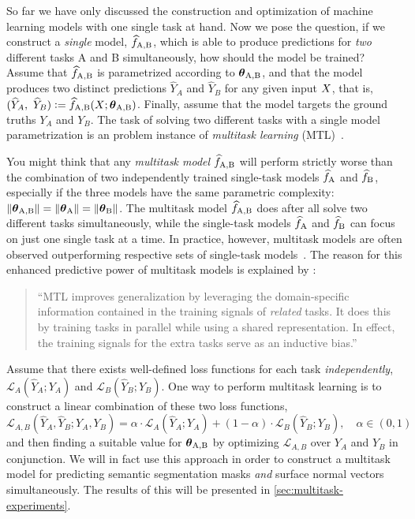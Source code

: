 So far we have only discussed the construction and optimization of machine learning models with one single task at hand.
Now we pose the question, if we construct a \emph{single} model, $\widehat{f}_{\mathrm{A,B}}$, which is able to produce predictions for \emph{two} different tasks A and B simultaneously, how should the model be trained?
Assume that $\widehat{f}_{\mathrm{A,B}}$ is parametrized according to $\boldsymbol{\theta}_{\mathrm{A,B}}$, and that the model produces two distinct predictions $\widehat{Y}_A$ and $\widehat{Y}_B$ for any given input $X$, that is, $(\widehat{Y}_A,~\widehat{Y}_B) \vcentcolon= \widehat{f}_{\mathrm{A,B}}(X; \boldsymbol{\theta}_{\mathrm{A,B}})$.
Finally, assume that the model targets the ground truths $Y_A$ and $Y_B$.
The task of solving two different tasks with a single model parametrization is an problem instance of \textit{multitask learning} (MTL)~\cite{multitask-learning}.

You might think that any \textit{multitask model} $\widehat{f}_{\mathrm{A,B}}$ will perform strictly worse than the combination of two independently trained single-task models $\widehat{f}_{\mathrm{A}}$ and $\widehat{f}_{\mathrm{B}}$, especially if the three models have the same parametric complexity: $\left\lVert\boldsymbol{\theta}_{\mathrm{A,B}}\right\rVert = \left\lVert\boldsymbol{\theta}_{\mathrm{A}}\right\rVert = \left\lVert\boldsymbol{\theta}_{\mathrm{B}}\right\rVert$.
The multitask model $\widehat{f}_{\mathrm{A,B}}$ does after all solve two different tasks simultaneously, while the single-task models $\widehat{f}_{\mathrm{A}}$ and $\widehat{f}_{\mathrm{B}}$ can focus on just one single task at a time.
In practice, however, multitask models are often observed outperforming respective sets of single-task models~\cite[Section 2]{multitask-learning}.
The reason for this enhanced predictive power of multitask models is explained by \citeauthor{multitask-learning}:
\begin{quotation}
  \enquote{MTL improves generalization by leveraging the domain-specific information contained in the training signals of \textit{related} tasks. It does this by training tasks in parallel while using a shared representation. In effect, the training signals for the extra tasks serve as an inductive bias.}~\cite[p.~41]{multitask-learning}
\end{quotation}

Assume that there exists well-defined loss functions for each task \emph{independently}, $\mathcal{L}_A(\widehat{Y}_A; Y_A)$ and $\mathcal{L}_B(\widehat{Y}_B; Y_B)$.
One way to perform multitask learning is to construct a linear combination of these two loss functions,
\begin{equation*}
  \mathcal{L}_{A,B}\left(\widehat{Y}_A, \widehat{Y}_B; Y_A, Y_B\right)
  =
  \alpha \cdot \mathcal{L}_A(\widehat{Y}_A; Y_A)
  +
  (1 - \alpha) \cdot \mathcal{L}_B(\widehat{Y}_B; Y_B),
  \quad \alpha \in (0, 1)
\end{equation*}
and then finding a suitable value for $\boldsymbol{\theta}_{\mathrm{A,B}}$ by optimizing $\mathcal{L}_{A,B}$ over $Y_A$ and $Y_B$ in conjunction.
We will in fact use this approach in order to construct a multitask model for predicting semantic segmentation masks \emph{and} surface normal vectors simultaneously.
The results of this will be presented in \cref{sec:multitask-experiments}.
